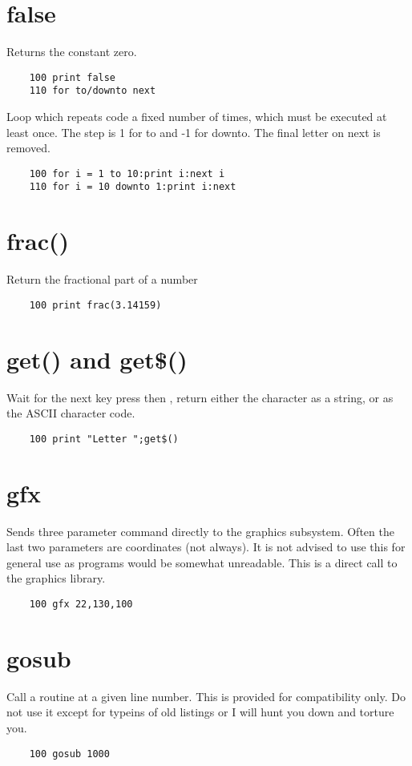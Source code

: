 \section*{false}
Returns the constant zero.
\example{}
\begin{verbatim}
	100 print false
	110 for to/downto next
\end{verbatim}
Loop which repeats code a fixed number of times, which must be executed at least once. The step is 1 for to and -1 for downto. The final letter on next is removed.
\example{}
\begin{verbatim}
	100 for i = 1 to 10:print i:next i
	110 for i = 10 downto 1:print i:next
\end{verbatim}

\section*{frac()}
Return the fractional part of a number
\example{}
\begin{verbatim}
	100 print frac(3.14159)
\end{verbatim}

\section*{get() and get\$()}
Wait for the next key press then , return either the character as a string, or as the ASCII character code. 
\example{}
\begin{verbatim}
	100 print "Letter ";get$()
\end{verbatim}

\section*{gfx}
Sends three parameter command directly to the graphics subsystem. Often the last two parameters are coordinates (not always).  It is not advised to use this for general use as programs would be somewhat unreadable.
This is a direct call to the graphics library.
\example{}
\begin{verbatim}
	100 gfx 22,130,100
\end{verbatim}

\section*{gosub}
Call a routine at a given line number. This is provided for compatibility only. Do not use it except for typeins of old listings or I will hunt you down and torture you.  
\example{}
\begin{verbatim}
	100 gosub 1000
\end{verbatim}

